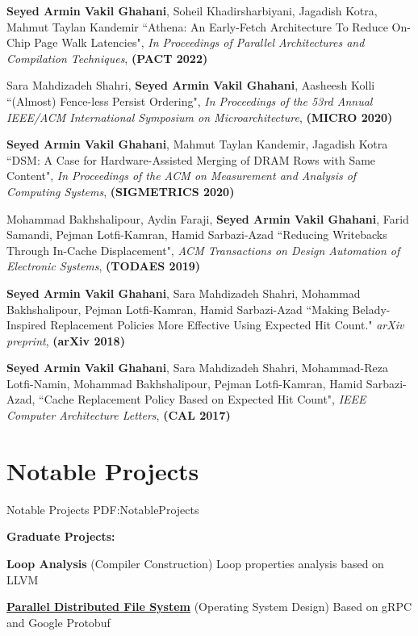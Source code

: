 \documentclass[a4paper,9pt,oneside]{article}
\begin{document}
\begin{body}
\BulletItem
\textbf{Seyed Armin Vakil Ghahani},
Soheil Khadirsharbiyani,
Jagadish Kotra,
Mahmut Taylan Kandemir
``Athena: An Early-Fetch Architecture To Reduce On-Chip Page Walk Latencies", \textit{In Proceedings of Parallel Architectures and Compilation Techniques}, \textbf{(PACT 2022)}

\BulletItem
Sara Mahdizadeh Shahri,
\textbf{Seyed Armin Vakil Ghahani},
Aasheesh Kolli
``(Almost) Fence-less Persist Ordering", \textit{In Proceedings of the 53rd Annual IEEE/ACM International Symposium on Microarchitecture}, \textbf{(MICRO 2020)}

\BulletItem
\textbf{Seyed Armin Vakil Ghahani},
Mahmut Taylan Kandemir,
Jagadish Kotra
``DSM: A Case for Hardware-Assisted Merging of DRAM Rows with Same Content", \textit{In Proceedings of the ACM on Measurement and Analysis of Computing Systems}, \textbf{(SIGMETRICS 2020)}

\BulletItem
Mohammad Bakhshalipour,
Aydin Faraji,
\textbf{Seyed Armin Vakil Ghahani},
Farid Samandi,
Pejman Lotfi-Kamran,
Hamid Sarbazi-Azad
``Reducing Writebacks Through In-Cache Displacement", \textit{ACM Transactions on Design Automation of Electronic Systems}, \textbf{(TODAES 2019)}

\BulletItem
\textbf{Seyed Armin Vakil Ghahani},
Sara Mahdizadeh Shahri,
Mohammad Bakhshalipour,
Pejman Lotfi-Kamran,
Hamid Sarbazi-Azad
``Making Belady-Inspired Replacement Policies More Effective Using Expected Hit Count." \textit{arXiv preprint}, \textbf{(arXiv 2018)}


\BulletItem
\textbf{Seyed Armin Vakil Ghahani},
Sara Mahdizadeh Shahri,
Mohammad-Reza Lotfi-Namin,
Mohammad Bakhshalipour,
Pejman Lotfi-Kamran,
Hamid Sarbazi-Azad,
``Cache Replacement Policy Based on Expected Hit Count", \textit{IEEE Computer Architecture Letters}, \textbf{(CAL 2017)}

\section
{Notable Projects}
{Notable Projects}
{PDF:NotableProjects}

\textbf{Graduate Projects:}

\BulletItem
\textbf{Loop Analysis}
(Compiler Construction)
\hfill
{}
\SubBulletItem
Loop properties analysis based on LLVM

\BulletItem
\href{https://github.com/arminvakil/PFS}
{\textbf{Parallel Distributed File System}}
(Operating System Design)
\hfill
{}
\SubBulletItem
Based on gRPC and Google Protobuf


\end{body}
\end{document}
